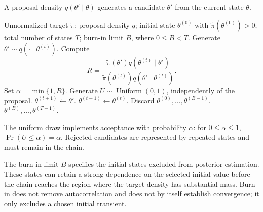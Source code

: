\documentclass[11pt,a4paper]{article}
\begin{document}
A proposal density \(q(\theta'\mid\theta)\) generates a candidate \(\theta'\) from the current state \(\theta\).

\begin{algorithm}[ht]
\caption{Metropolis--Hastings with burn-in}
\label{alg:mh}
\begin{algorithmic}[1]
\Require Unnormalized target \(\widetilde\pi\); proposal density \(q\); initial state \(\theta^{(0)}\) with \(\widetilde\pi(\theta^{(0)})>0\); total number of states \(T\); burn-in limit \(B\), where \(0\le B<T\).
    \State Generate \(\theta'\sim q(\cdot\mid\theta^{(t)})\).
    \State Compute
    \[
      R=\frac{\widetilde\pi(\theta')q(\theta^{(t)}\mid\theta')}
      {\widetilde\pi(\theta^{(t)})q(\theta'\mid\theta^{(t)})}.
    \]
    \State Set \(\alpha=\min\{1,R\}\).
    \State Generate \(U\sim\operatorname{Uniform}(0,1)\), independently of the proposal.
        \State \(\theta^{(t+1)}\gets\theta'\). 
    \Else
        \State \(\theta^{(t+1)}\gets\theta^{(t)}\). 
    \EndIf
\EndFor
\State Discard \(\theta^{(0)},\ldots,\theta^{(B-1)}\).
\State \Return \(\theta^{(B)},\ldots,\theta^{(T-1)}\).
\end{algorithmic}
\end{algorithm}

The uniform draw implements acceptance with probability \(\alpha\): for \(0\le\alpha\le1\), \(\Pr(U\le\alpha)=\alpha\). Rejected candidates are represented by repeated states and must remain in the chain.

The burn-in limit \(B\) specifies the initial states excluded from posterior estimation. These states can retain a strong dependence on the selected initial value before the chain reaches the region where the target density has substantial mass. Burn-in does not remove autocorrelation and does not by itself establish convergence; it only excludes a chosen initial transient.
\end{document}
